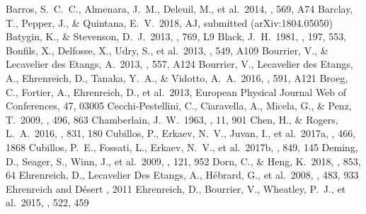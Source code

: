 \documentclass{aa}
\begin{document}
\begin{thebibliography}{}
    Barros, S.~C.~C., Almenara, J.~M., Deleuil, M., et al.\ 2014,
\aap, 569, A74
    Barclay, T., Pepper, J., \& Quintana, E.~V.\ 2018, AJ, submitted (arXiv:1804.05050)
    Batygin, K., \& Stevenson, D.~J.\ 2013, \apjl, 769, L9
    Black, J.~H.\ 1981, \mnras, 197, 553,
    Bonfils, X., Delfosse, X., Udry, S., et al.\ 2013, \aap, 549, A109
    Bourrier, V., \& Lecavelier des Etangs, A.\ 2013, \aap, 557, A124
    Bourrier, V., Lecavelier des Etangs, A., Ehrenreich, D., Tanaka, Y.~A.,         \& Vidotto, A.~A.\ 2016, \aap, 591, A121
    Broeg, C., Fortier, A., Ehrenreich, D., et al.\ 2013, European Physical         Journal Web of Conferences, 47, 03005
    Cecchi-Pestellini, C., Ciaravella, A., Micela, G., \& Penz, T.\ 2009,           \aap, 496, 863
    Chamberlain, J.~W.\ 1963, \planss, 11, 901
    Chen, H., \& Rogers, L.~A.\ 2016, \apj, 831, 180
    Cubillos, P., Erkaev, N.~V., Juvan, I., et al.\ 2017a, \mnras, 466, 1868
    Cubillos, P.~E., Fossati, L., Erkaev, N.~V., et al.\ 2017b, \apj, 849,          145
    Deming, D., Seager, S., Winn, J., et al.\ 2009, \pasp, 121, 952
    Dorn, C., \& Heng, K.\ 2018, \apj, 853, 64
    Ehrenreich, D., Lecavelier Des Etangs, A., H{\'e}brard, G., et al.\             2008, \aap, 483, 933
    Ehrenreich and D\'{e}sert \aap, 2011
    Ehrenreich, D., Bourrier, V., Wheatley, P.~J., et al.\ 2015, \nat, 522,         459

\end{thebibliography}
\end{document}
